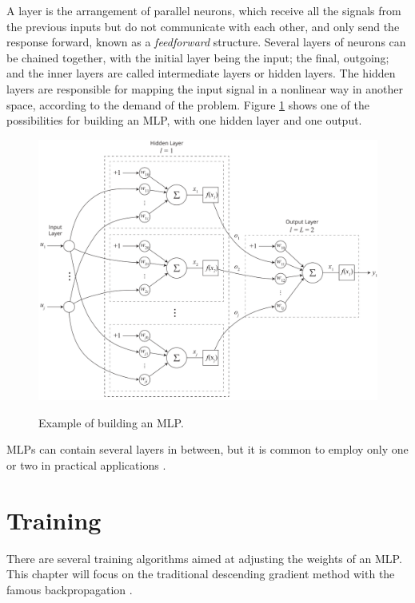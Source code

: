 A layer is the arrangement of parallel neurons, which receive all the signals from the previous inputs but do not communicate with each other, and only send the response forward, known as a \textit{feedforward} structure. Several layers of neurons can be chained together, with the initial layer being the input; the final, outgoing; and the inner layers are called intermediate layers or hidden layers. The hidden layers are responsible for mapping the input signal in a nonlinear way in another space, according to the demand of the problem. Figure \ref{fig:mlp} shows one of the possibilities for building an MLP, with one hidden layer and one output.

\begin{figure}[h!]
    \centering
    \caption{Example of building an MLP.}
    \vspace{0.2cm}
    \includegraphics[width=1\textwidth]{"Part 3 - Learning Systems/Supervised Learning/Multilayer Perceptron/MLP.png"}
    \label{fig:mlp}
\end{figure}

MLPs can contain several layers in between, but it is common to employ only one or two in practical applications \cite{haykin}.

\section{Training}
\label{ssec:treino}

There are several training algorithms aimed at adjusting the weights of an MLP. This chapter will focus on the traditional descending gradient method with the famous backpropagation \cite{rumelhart1986learning}.

